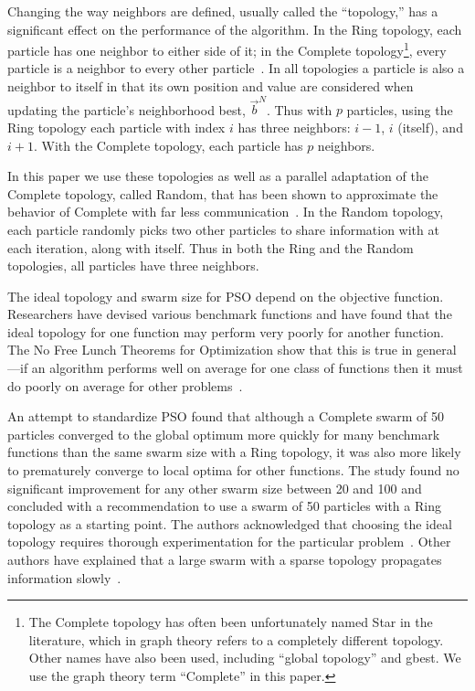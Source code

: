 \documentclass[ms,electronic,twosidetoc,letterpaper,chaptercenter,parttop,equalmargins]{byumsphd}
\providecommand{\neigh}{\ensuremath{N}}
\providecommand{\nbest}{\ensuremath{\Vec{b}^\neigh}}
\begin{document}
Changing the way neighbors are defined, usually called the ``topology,'' has a
significant effect on the performance of the algorithm.  In the Ring topology,
each particle has one neighbor to either side of it; in the Complete
topology\footnote{The Complete topology has often been unfortunately named Star
in the literature, which in graph theory refers to a completely different
topology.  Other names have also been used, including ``global topology'' and
gbest.  We use the graph theory term ``Complete'' in this paper.}, every
particle is a neighbor to every other
particle~\citep{bratton-2007-defining-a-standard-for-pso}.  In all topologies a
particle is also a neighbor to itself in that its own position and value are
considered when updating the particle's neighborhood best, $\nbest$.  Thus with
$p$ particles, using the Ring topology each particle with index $i$ has three
neighbors: $i-1$, $i$ (itself), and $i+1$.  With the Complete topology, each
particle has $p$ neighbors.

In this paper we use these topologies as well as a parallel adaptation of the
Complete topology, called Random, that has been shown to approximate the
behavior of Complete with far less
communication~\citep{mcnabb-2009-large-particle-swarms}.  In the Random
topology, each particle randomly picks two other particles to share information
with at each iteration, along with itself.  Thus in both the Ring and the
Random topologies, all particles have three neighbors.

The ideal topology and swarm size for PSO depend on the objective function.
Researchers have devised various benchmark functions and have found that the
ideal topology for one function may perform very poorly for another function.
The No Free Lunch Theorems for Optimization show that this is true in
general---if an algorithm performs well on average for one class of functions
then it must do poorly on average for other
problems~\citep{wolpert-1997-nfl-for-optimization}.

An attempt to standardize PSO found that although a Complete swarm of 50
particles converged to the global optimum more quickly for many benchmark
functions than the same swarm size with a Ring topology, it was also more
likely to prematurely converge to local optima for other functions.  The study
found no significant improvement for any other swarm size between 20 and 100
and concluded with a recommendation to use a swarm of 50 particles with a Ring
topology as a starting point.  The authors acknowledged that choosing the ideal
topology requires thorough experimentation for the particular
problem~\citep{bratton-2007-defining-a-standard-for-pso}.  Other authors have
explained that a large swarm with a sparse topology propagates information
slowly~\citep{montes-de-oca-2009-frankensteins-pso}.
\end{document}
